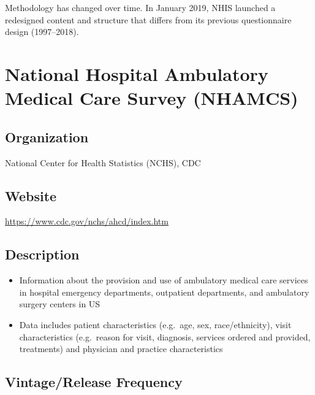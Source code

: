\documentclass[
]{book}
\providecommand{\tightlist}{%
  \setlength{\itemsep}{0pt}\setlength{\parskip}{0pt}}
\begin{document}
Methodology has changed over time. In January 2019, NHIS launched a redesigned content and structure that differs from its previous questionnaire design (1997--2018).

\mainmatter

\hypertarget{national-hospital-ambulatory-medical-care-survey-nhamcs}{%
\chapter{National Hospital Ambulatory Medical Care Survey (NHAMCS)}\label{national-hospital-ambulatory-medical-care-survey-nhamcs}}

\hypertarget{organization-52}{%
\section{Organization}\label{organization-52}}

National Center for Health Statistics (NCHS), CDC

\hypertarget{website-52}{%
\section{Website}\label{website-52}}

\url{https://www.cdc.gov/nchs/ahcd/index.htm}

\hypertarget{description-52}{%
\section{Description}\label{description-52}}

\begin{itemize}
\tightlist
\item
  Information about the provision and use of ambulatory medical care services in hospital emergency departments, outpatient departments, and ambulatory surgery centers in US
\item
  Data includes patient characteristics (e.g.~age, sex, race/ethnicity), visit characteristics (e.g.~reason for visit, diagnosis, services ordered and provided, treatments) and physician and practice characteristics
\end{itemize}

\hypertarget{vintagerelease-frequency-52}{%
\section{Vintage/Release Frequency}\label{vintagerelease-frequency-52}}
\end{document}
